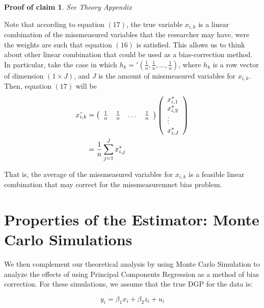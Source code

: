\documentclass[10pt]{article}
\newtheorem{claimproof}{Proof of claim}[claim]
\begin{document}
\begin{claimproof}
See Theory Appendix
\end{claimproof}


        
        Note that according to equation $(17)$, the true variable $x_{i,k}$ is a linear combination of the missmeasured variables that the researcher may have, were the weights are such that equation $(16)$ is satisfied. This allows us to think about other linear combination that could be used as a bias-correction method. In particular, take the case in which $h_k='(\frac{1}{n},\frac{1}{n},\dots,\frac{1}{n})$, where $h_k$ is a row vector of dimension $(1\times J)$, and $J$ is the amount of missmeasured variables for $x_{i,k}$. Then, equation $(17)$ will be
        \begin{align}
            \Tilde{x_{i,k}}&=\left(\begin{array}{cccc}
        \frac{1}{n} & \frac{1}{n} & \dots &\frac{1}{n} 
        \end{array}\right)\left(\begin{array}{l}
        x^*_{i,1} \\
        x^*_{i,2} \\
        \vdots \\
        x^*_{i,J} 
        \end{array}\right)\\
        &=\frac{1}{n}\sum_{j=1}^J x^*_{i,j}
        \end{align}
        
        That is, the average of the missmeasured variables for $x_{i,k}$ is a feasible linear combination that may correct for the missmeasuremnet bias problem.

\section*{Properties of the Estimator: Monte Carlo Simulations}

We then complement our theoretical analysis by using Monte Carlo Simulation to analyze the effects of using Principal Components Regression as a method of bias correction. For these simulations, we assume that the true DGP for the data is:

$$y_i = \beta_1 x_i + \beta_2 z_i + u_i$$
\end{document}
